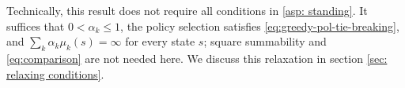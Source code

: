 Technically, this result does not require all conditions in \autoref{asp: standing}. It suffices that $0<\alpha_k\le1$, the policy selection satisfies \eqref{eq:greedy-pol-tie-breaking}, and $\sum_k\alpha_k\mu_k(s)=\infty$ for every state $s$; square summability and \eqref{eq:comparison} are not needed here. We discuss this relaxation in section \ref{sec: relaxing conditions}.
























































